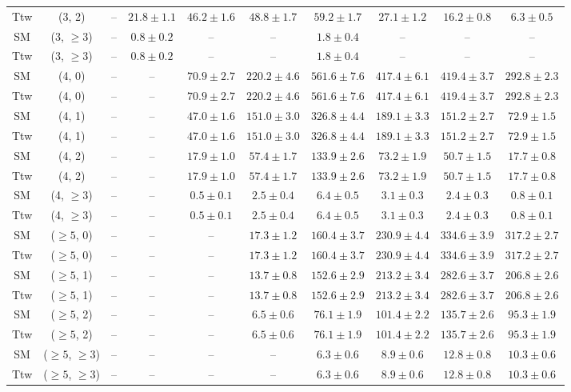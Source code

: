 \begin{table}[h!]
{\begin{tabular}{cccccccccc}
	Ttw & (3, 2) & -- & $21.8\pm 1.1$ & $46.2\pm 1.6$ & $48.8\pm 1.7$ & $59.2\pm 1.7$ & $27.1\pm 1.2$ & $16.2\pm 0.8$ & $6.3\pm 0.5$ \\[0.5ex] 
	SM & (3, $\ge3$) & -- & $0.8\pm 0.2$ & -- & -- & $1.8\pm 0.4$ & -- & -- & -- \\[0.5ex] 
	Ttw & (3, $\ge3$) & -- & $0.8\pm 0.2$ & -- & -- & $1.8\pm 0.4$ & -- & -- & -- \\[0.5ex] 
	SM & (4, 0) & -- & -- & $70.9\pm 2.7$ & $220.2\pm 4.6$ & $561.6\pm 7.6$ & $417.4\pm 6.1$ & $419.4\pm 3.7$ & $292.8\pm 2.3$ \\[0.5ex] 
	Ttw & (4, 0) & -- & -- & $70.9\pm 2.7$ & $220.2\pm 4.6$ & $561.6\pm 7.6$ & $417.4\pm 6.1$ & $419.4\pm 3.7$ & $292.8\pm 2.3$ \\[0.5ex] 
	SM & (4, 1) & -- & -- & $47.0\pm 1.6$ & $151.0\pm 3.0$ & $326.8\pm 4.4$ & $189.1\pm 3.3$ & $151.2\pm 2.7$ & $72.9\pm 1.5$ \\[0.5ex] 
	Ttw & (4, 1) & -- & -- & $47.0\pm 1.6$ & $151.0\pm 3.0$ & $326.8\pm 4.4$ & $189.1\pm 3.3$ & $151.2\pm 2.7$ & $72.9\pm 1.5$ \\[0.5ex] 
	SM & (4, 2) & -- & -- & $17.9\pm 1.0$ & $57.4\pm 1.7$ & $133.9\pm 2.6$ & $73.2\pm 1.9$ & $50.7\pm 1.5$ & $17.7\pm 0.8$ \\[0.5ex] 
	Ttw & (4, 2) & -- & -- & $17.9\pm 1.0$ & $57.4\pm 1.7$ & $133.9\pm 2.6$ & $73.2\pm 1.9$ & $50.7\pm 1.5$ & $17.7\pm 0.8$ \\[0.5ex] 
	SM & (4, $\ge3$) & -- & -- & $0.5\pm 0.1$ & $2.5\pm 0.4$ & $6.4\pm 0.5$ & $3.1\pm 0.3$ & $2.4\pm 0.3$ & $0.8\pm 0.1$ \\[0.5ex] 
	Ttw & (4, $\ge3$) & -- & -- & $0.5\pm 0.1$ & $2.5\pm 0.4$ & $6.4\pm 0.5$ & $3.1\pm 0.3$ & $2.4\pm 0.3$ & $0.8\pm 0.1$ \\[0.5ex] 
	SM & ($\ge5$, 0) & -- & -- & -- & $17.3\pm 1.2$ & $160.4\pm 3.7$ & $230.9\pm 4.4$ & $334.6\pm 3.9$ & $317.2\pm 2.7$ \\[0.5ex] 
	Ttw & ($\ge5$, 0) & -- & -- & -- & $17.3\pm 1.2$ & $160.4\pm 3.7$ & $230.9\pm 4.4$ & $334.6\pm 3.9$ & $317.2\pm 2.7$ \\[0.5ex] 
	SM & ($\ge5$, 1) & -- & -- & -- & $13.7\pm 0.8$ & $152.6\pm 2.9$ & $213.2\pm 3.4$ & $282.6\pm 3.7$ & $206.8\pm 2.6$ \\[0.5ex] 
	Ttw & ($\ge5$, 1) & -- & -- & -- & $13.7\pm 0.8$ & $152.6\pm 2.9$ & $213.2\pm 3.4$ & $282.6\pm 3.7$ & $206.8\pm 2.6$ \\[0.5ex] 
	SM & ($\ge5$, 2) & -- & -- & -- & $6.5\pm 0.6$ & $76.1\pm 1.9$ & $101.4\pm 2.2$ & $135.7\pm 2.6$ & $95.3\pm 1.9$ \\[0.5ex] 
	Ttw & ($\ge5$, 2) & -- & -- & -- & $6.5\pm 0.6$ & $76.1\pm 1.9$ & $101.4\pm 2.2$ & $135.7\pm 2.6$ & $95.3\pm 1.9$ \\[0.5ex] 
	SM & ($\ge5$, $\ge3$) & -- & -- & -- & -- & $6.3\pm 0.6$ & $8.9\pm 0.6$ & $12.8\pm 0.8$ & $10.3\pm 0.6$ \\[0.5ex] 
	Ttw & ($\ge5$, $\ge3$) & -- & -- & -- & -- & $6.3\pm 0.6$ & $8.9\pm 0.6$ & $12.8\pm 0.8$ & $10.3\pm 0.6$ \\[0.5ex] 
	\hline
	\hline
\end{tabular}}
\end{table}
